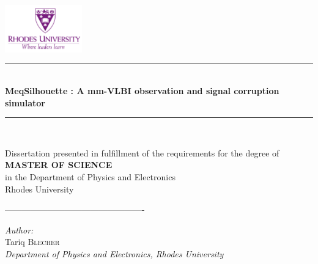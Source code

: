 \begin{titlepage}

\newcommand{\HRule}{\rule{\linewidth}{0.5mm}} %

\center %
 

\includegraphics[width=0.25\textwidth]{Images/Rhode.png}\\[1cm] %



\HRule \\[0.4cm]
{ \huge \bfseries MeqSilhouette : A mm-VLBI observation and signal corruption simulator}\\[0.4cm]
\HRule \\[1.5cm]


\begin{center}
 {\large Dissertation presented in fulfillment of the requirements for the degree of} \\
 {\large \textbf{MASTER OF SCIENCE}} \\
 {\large in the Department of Physics and Electronics} \\
 {\large Rhodes University}
\end{center}
\vspace{0.15\textheight}
-------------------------------------------------
\begin{minipage}{0.4\textwidth}
\begin{flushleft} \large
\emph{Author:} \\
Tariq \textsc{Blecher} \\
{\small \textit{Department of Physics and Electronics, Rhodes University}}\\
\end{flushleft}
\end{minipage}


\end{titlepage}
